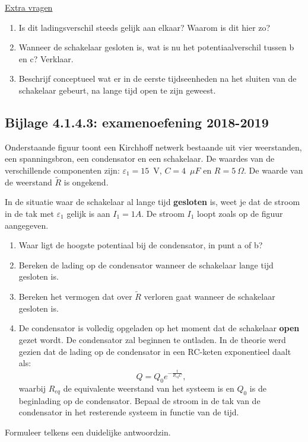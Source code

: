 \underline{Extra vragen}
\begin{enumerate}
\item Is dit ladingsverschil steeds gelijk aan elkaar? Waarom is dit hier zo?
\item Wanneer de schakelaar gesloten is, wat is nu het potentiaalverschil tussen b en c? Verklaar.
\item Beschrijf conceptueel wat er in de eerste tijdseenheden na het sluiten van de schakelaar  gebeurt, na lange tijd open te zijn geweest.
\end{enumerate}



\subsection*{Bijlage 4.1.4.3: examenoefening 2018-2019}
	
Onderstaande figuur toont een Kirchhoff netwerk bestaande uit vier weerstanden, een spanningsbron, een condensator en een schakelaar. De waardes van de verschillende componenten zijn: $\varepsilon_1=15$~V, $C=4$~$\mu F$ en $R=5~\Omega$. De waarde van de weerstand $\tilde{R}$ is ongekend. 

In de situatie waar de schakelaar al lange tijd \textbf{gesloten} is, weet je dat de stroom in de tak met $\varepsilon_1$ gelijk is aan $I_1 = 1A$. De stroom $I_1$ loopt zoals op de figuur aangegeven.

\begin{enumerate}
	\item Waar ligt de hoogste potentiaal bij de condensator, in punt a of b?
	\item Bereken de lading op de condensator wanneer de schakelaar lange tijd gesloten is.
	\item Bereken het vermogen dat over $\tilde{R}$ verloren gaat wanneer de schakelaar gesloten is.
	\item De condensator is volledig opgeladen op het moment dat de schakelaar \textbf{open} gezet wordt. De condensator zal beginnen te ontladen. In de theorie werd gezien dat de lading op de condensator in een RC-keten exponentieel daalt als: \[Q=Q_0e^{-\frac{t}{R_{eq}C}},\] waarbij $R_{eq}$ de equivalente weerstand van het systeem is en $Q_0$ is de beginlading op de condensator. Bepaal de stroom in de tak van de condensator in het resterende systeem in functie van de tijd.
\end{enumerate}
Formuleer telkens  een duidelijke antwoordzin. 

\def\x{6}
\def\y{6}
\def\dx{3}
\def\dy{3}

